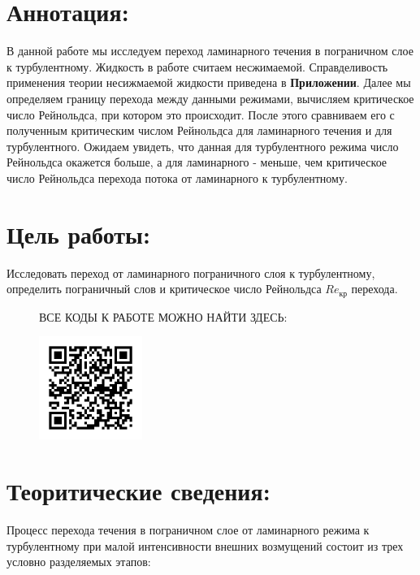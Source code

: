 \documentclass[a4paper]{article}
\begin{document}


\section*{Аннотация:}

В данной работе мы исследуем переход ламинарного течения в пограничном слое к турбулентному. Жидкость в работе считаем несжимаемой. Справделивость применения теории несижмаемой жидкости приведена в \textbf{Приложении}. Далее мы определяем границу перехода между данными режимами, вычисляем критическое число Рейнольдса, при котором это происходит. После этого сравниваем его с полученным критическим числом Рейнольдса для ламинарного течения и для турбулентного. Ожидаем увидеть, что данная для турбулентного режима число Рейнольдса окажется больше, а для ламинарного - меньше, чем критическое число Рейнольдса перехода потока от ламинарного к турбулентному.




\section*{Цель работы:} 
Исследовать переход от ламинарного пограничного слоя к турбулентному, определить пограничный слов и критическое число Рейнольдса $Re_{\text{кр}}$ перехода.




\vspace{4cm}

\begin {figure}[H]
\begin{center}
\large{ВСЕ КОДЫ К РАБОТЕ МОЖНО НАЙТИ ЗДЕСЬ:}
\par
\includegraphics[width=0.3\textwidth]{qr.png}
\end{center}
\end {figure}




\newpage
\section*{Теоритические сведения:}
Процесс перехода течения в пограничном слое от ламинарного режима к турбулентному при малой интенсивности внешних возмущений состоит из трех условно разделяемых этапов: 
\end{document}
